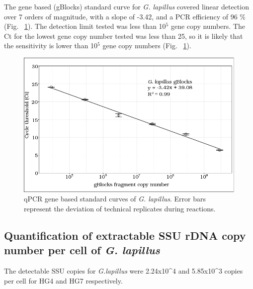 \documentclass[12pt]{article}
\begin{document}
The gene based (gBlocks) standard curve for \emph{G. lapillus} covered linear detection over 7 orders of magnitude, with a slope of -3.42, and a PCR efficiency of 96 \% (Fig. ~\ref{fig:lapigblocks}). 
The detection limit tested was less than 10$^{5}$ gene copy numbers. 
The Ct for the lowest gene copy number tested was less than 25, so it is likely that the sensitivity is lower than 10$^{5}$ gene copy numbers (Fig. ~\ref{fig:lapigblocks}).\\
\begin{figure}
\includegraphics[scale=.8]{Hero_qpcr-figs/Fig3_gblocks-standards.png}
\caption{qPCR gene based standard curves of \emph{G. lapillus}. Error bars represent the deviation of technical replicates during reactions.}%
\label{fig:lapigblocks}
\end{figure}
\FloatBarrier

\FloatBarrier

\subsection*{Quantification of extractable SSU rDNA copy number per cell of \emph{G. lapillus}}%
The detectable SSU copies for \emph{G.lapillus} were 2.24x10^{4} and 5.85x10^{3} copies per cell for HG4 and HG7 respectively. 
\end{document}
